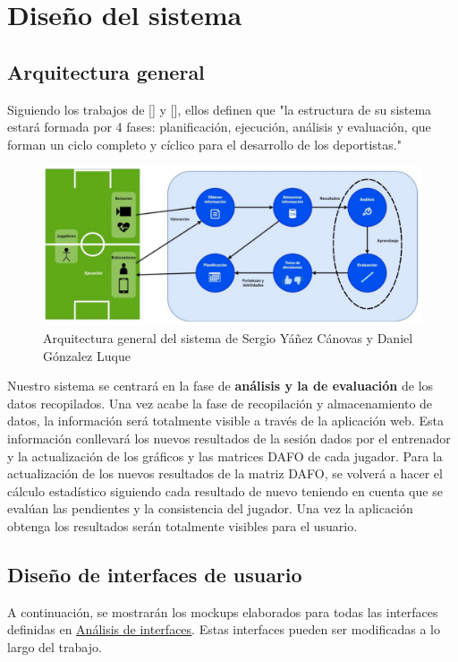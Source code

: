 \section{Diseño del sistema}
\subsection{Arquitectura general}
Siguiendo los trabajos de [\cite{TFG_Daniel}] y [\cite{TFG_Sergio}], ellos definen que "la estructura de su sistema estará formada por 4 fases: planificación, ejecución, análisis y 
evaluación, que forman un ciclo completo y cíclico para el desarrollo de los deportistas."

\begin{figure}[H]
    \centering
    \includegraphics[width=15cm]{archivos/tfg_jorge/arquitectura_general_Sergio}
    \caption{Arquitectura general del sistema de Sergio Yáñez Cánovas y Daniel Gónzalez Luque}\label{sistemass2}
\end{figure}

Nuestro sistema se centrará en la fase de \textbf{análisis y la de evaluación} de los datos recopilados.
Una vez acabe la fase de recopilación y almacenamiento de datos, la información será totalmente visible a través de la aplicación web. Esta información conllevará los nuevos resultados de la sesión dados por el entrenador y la actualización de los gráficos y las matrices DAFO de cada jugador.
Para la actualización de los nuevos resultados de la matriz DAFO, se volverá a hacer el cálculo estadístico siguiendo cada resultado de nuevo teniendo en cuenta que se evalúan las pendientes y la consistencia del jugador. Una vez la aplicación obtenga los resultados serán totalmente visibles para el usuario.
\subsection{Diseño de interfaces de usuario}
A continuación, se mostrarán los mockups elaborados para todas las interfaces definidas en \hyperref[subsec:int_analysis]{Análisis de interfaces}. Estas interfaces pueden ser modificadas a lo largo del trabajo.

